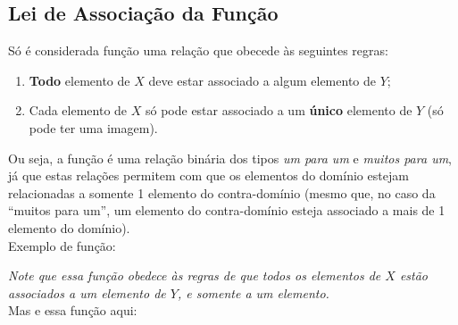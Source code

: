 \documentclass[13pt,letterpaper]{article}
\begin{document}
\subsection{Lei de Associação da Função}
Só é considerada função uma relação que obecede às seguintes regras:
\begin{enumerate}
    \item \textbf{Todo} elemento de $X$ deve estar associado a algum elemento de $Y$;
    \item Cada elemento de $X$ só pode estar associado a um \textbf{único} elemento de $Y$ (só pode ter uma imagem).
\end{enumerate}
Ou seja, a função é uma relação binária dos tipos \emph{um para um} e \emph{muitos para um}, já que estas relações permitem com que os elementos do domínio estejam relacionadas a somente 1 elemento do contra-domínio (mesmo que, no caso da \enquote{muitos para um}, um elemento do contra-domínio esteja associado a mais de 1 elemento do domínio). \\
Exemplo de função:
\begin{center}
\end{center}
\emph{Note que essa função obedece às regras de que todos os elementos de $X$ estão associados a um elemento de $Y$, e somente a um elemento.} \\
Mas e essa função aqui:
\end{document}
